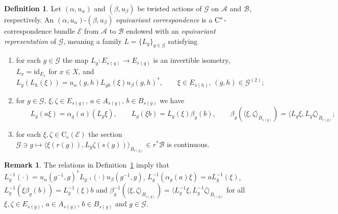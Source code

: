 \documentclass[11 pt, leqno]{amsart}
\numberwithin{equation}{section}
\theoremstyle{plain}
\theoremstyle{definition}
\newtheorem {defn}[thm] {Definition}
\newtheorem {rem} [thm]{Remark}
\newcommand*{\contc}{\mathrm{C_c}}%
\newcommand{\B}{\mathcal B}
\newcommand{\G}{\mathcal G} %
\newcommand{\EE}{\mathcal E}
\newcommand{\A}{\mathcal A}
\newcommand{\cst}{\ifmmode\mathrm{C}^*\else{$\mathrm{C}^*$}\fi}
\begin{document}
\begin{defn}\label{def:equivariant_representation} 
Let $(\alpha, u_{\alpha})$ and $(\beta,u_{\beta})$ be twisted actions of $\G$ on $\A$ and $\B$, respectively. %
An $(\alpha, u_{\alpha})$-$(\beta,u_{\beta})$ \emph{equivariant correspondence} is a $\cst$-correspondence bundle $\EE$ from $\A$ to $\B$ endowed with an \emph{equivariant representation} of $\G$, meaning a family $L=\{L_g\}_{g\in \G}$ satisfying  
\begin{enumerate}
    \item\label{enu:equivariant_representation1} for each $g\in \G$ the map $L_g:E_{s(g)}\to E_{r(g)}$ is an invertible isometry, $L_x = \mathrm{id}_{E_x}$ for $x\in X$, and 
    \[
        L_{g}(L_{h}(\xi)) = u_{\alpha}(g,h)L_{gh}(\xi)u_{\beta}(g,h)^*, \qquad \xi\in E_{s(h)},\, (g,h)\in \G^{(2)};
    \]
    \item\label{enu:equivariant_representation2} for $g \in \G$, $\xi,\zeta \in E_{s(g)}$, $a\in A_{s(g)}$, $b\in B_{s(g)}$ we have 
    \[
        \qquad L_{g} (a \xi)=\alpha_{g}(a)  (L_{g}\xi), \qquad L_{g}(\xi b)=L_{g}(\xi) \beta_{g}(b),\qquad \beta_{g}(  \langle  \xi,\zeta\rangle_{B_{s(g)}})= \langle  L_{g}\xi, L_{g}\zeta\rangle_{B_{r(g)}};
    \]
    \item\label{enu:equivariant_representation3} for each $\xi, \zeta \in \contc(\EE)$ the section $\G\ni g \longmapsto \langle \xi(r(g)),L_g \zeta(s(g))\rangle_{B_{r(g)}}\in r^*\B$ is continuous.
\end{enumerate}
\end{defn}

\begin{rem}\label{rem:relations_equivariant_reps} 
The relations in Definition~\ref{def:equivariant_representation} imply that $L_g^{-1}(\cdot) = u_{\alpha}(g^{-1},g)^* L_{g^{-1}}(\cdot)u_{\beta}(g^{-1},g)$, $L_{g}^{-1} (\alpha_{g}(a) \xi) = a L_{g}^{-1}(\xi)$, $L_{g}^{-1}(\xi \beta_{g}(b))=L_{g}^{-1}(\xi) b$ and  $\beta_{g}^{-1}( \langle \xi,\zeta\rangle_{B_{s(g)}}) = \langle  L_{g}^{-1}\xi, L_{g}^{-1}\zeta\rangle_{B_{r(g)}}$ for all $\xi, \zeta \in E_{s(g)}$, $a\in A_{s(g)}$, $b\in B_{s(g)}$ and $g\in \G$. 
\end{rem}
\end{document}
